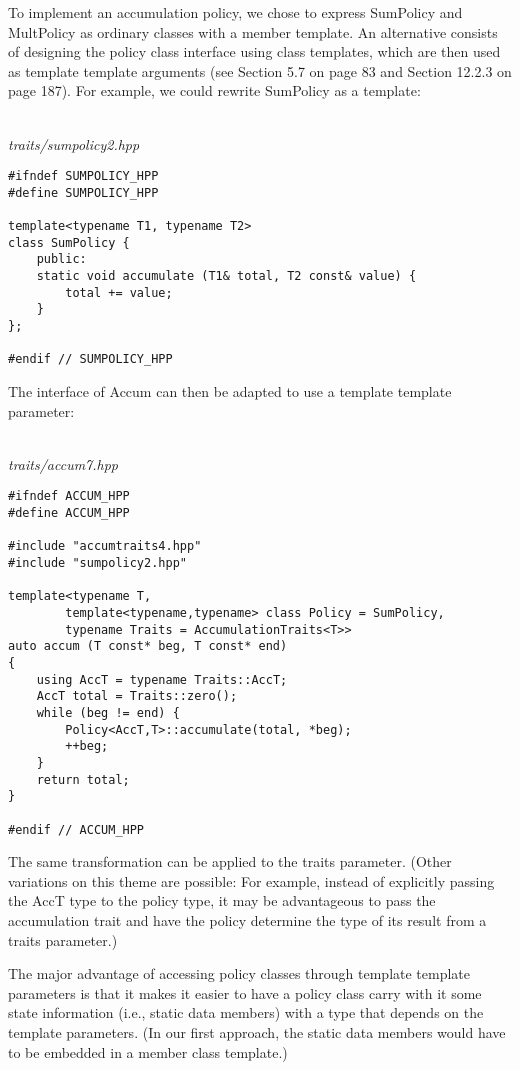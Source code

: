To implement an accumulation policy, we chose to express SumPolicy and MultPolicy as ordinary classes with a member template. An alternative consists of designing the policy class interface using class templates, which are then used as template template arguments (see Section 5.7 on page 83 and Section 12.2.3 on page 187). For example, we could rewrite SumPolicy as a template:

\hspace*{\fill} \\ %
\noindent
\textit{traits/sumpolicy2.hpp}
\begin{lstlisting}[style=styleCXX]
#ifndef SUMPOLICY_HPP
#define SUMPOLICY_HPP

template<typename T1, typename T2>
class SumPolicy {
	public:
	static void accumulate (T1& total, T2 const& value) {
		total += value;
	}
};

#endif // SUMPOLICY_HPP
\end{lstlisting}

The interface of Accum can then be adapted to use a template template parameter:

\hspace*{\fill} \\ %
\noindent
\textit{traits/accum7.hpp}
\begin{lstlisting}[style=styleCXX]
#ifndef ACCUM_HPP
#define ACCUM_HPP

#include "accumtraits4.hpp"
#include "sumpolicy2.hpp"

template<typename T,
		template<typename,typename> class Policy = SumPolicy,
		typename Traits = AccumulationTraits<T>>
auto accum (T const* beg, T const* end)
{
	using AccT = typename Traits::AccT;
	AccT total = Traits::zero();
	while (beg != end) {
		Policy<AccT,T>::accumulate(total, *beg);
		++beg;
	}
	return total;
}

#endif // ACCUM_HPP
\end{lstlisting}

The same transformation can be applied to the traits parameter. (Other variations on this theme are possible: For example, instead of explicitly passing the AccT type to the policy type, it may be advantageous to pass the accumulation trait and have the policy determine the type of its result from a traits parameter.)

The major advantage of accessing policy classes through template template parameters is that it makes it easier to have a policy class carry with it some state information (i.e., static data members) with a type that depends on the template parameters. (In our first approach, the static data members would have to be embedded in a member class template.)

